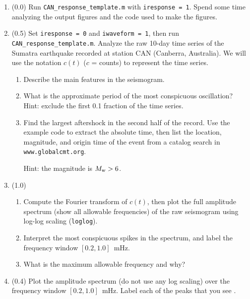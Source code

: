 \documentclass[11pt,titlepage,fleqn]{article}
\begin{document}
\begin{enumerate}
\item (0.0) Run \verb+CAN_response_template.m+ with \verb+iresponse = 1+. Spend some time analyzing the output figures and the code used to make the figures.


\item (0.5) Set \verb+iresponse = 0+ and \verb+iwaveform = 1+, then run \verb+CAN_response_template.m+. Analyze the raw 10-day time series of the Sumatra earthquake recorded at station CAN (Canberra, Australia). We will use the notation $c(t)$ ($c$ =  counts) to represent the time series.

\begin{enumerate}
\item Describe the main features in the seismogram.
\item What is the approximate period of the most conspicuous oscillation? \\
Hint: exclude the first 0.1 fraction of the time series.
\item Find the largest aftershock in the second half of the record. Use the example code to extract the absolute time, then list the location, magnitude, and origin time of the event from a catalog search in \verb+www.globalcmt.org+.

Hint: the magnitude is $M_{\rm w} > 6$.
\end{enumerate}


\item (1.0)
\begin{enumerate}
\item Compute the Fourier transform of $c(t)$, then plot the full amplitude spectrum (\ie show all allowable frequencies) of the raw seismogram using log-log scaling (\verb+loglog+).
\item Interpret the most conspicuous spikes in the spectrum, and label the frequency window $[0.2,1.0]$~mHz.
\item What is the maximum allowable frequency and why?
\end{enumerate}


\item (0.4) Plot the amplitude spectrum (do not use any log scaling) over the frequency window $[0.2,1.0]$~mHz. Label each of the peaks that you see \citep[\eg][]{Park2005}.



\end{enumerate}
\end{document}
